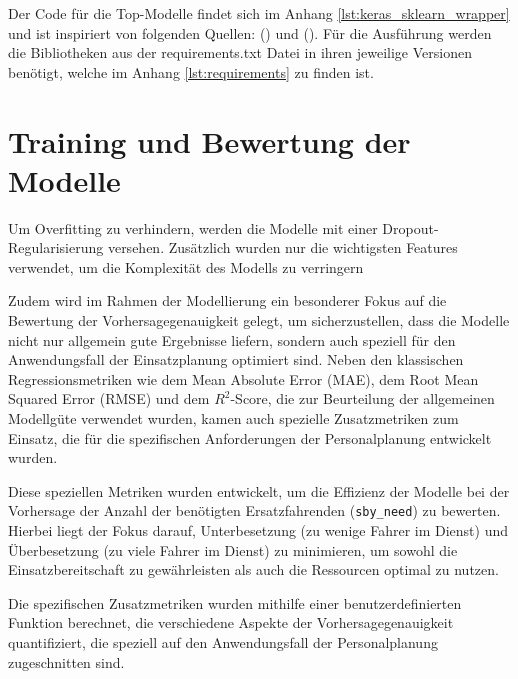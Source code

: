 \documentclass[%
pdftex,
oneside,			%
11pt,				%
parskip=half,		%
headheight = 12pt,	%
headsepline,		%
footsepline,		%
footheight = 16pt,	%
abstracton,		%
DIV=calc,		%
BCOR=8mm,		%
headinclude=false,	%
footinclude=false,	%
listof=totoc,		%
toc=bibliography,	%
]{scrreprt}	%
\begin{document}
        Der Code für die Top-Modelle findet sich im Anhang \ref{lst:keras_sklearn_wrapper} und ist inspiriert von folgenden Quellen: (\cite[][]{keras_cheat_sheet}) und (\cite[][]{tensorflow_keras}).
        Für die Ausführung werden die Bibliotheken aus der requirements.txt Datei in ihren jeweilige Versionen benötigt, welche im Anhang \ref{lst:requirements} zu finden ist.

    \section{Training und Bewertung der Modelle}

        Um Overfitting zu verhindern, werden die Modelle mit einer Dropout-Regularisierung versehen. 
        Zusätzlich wurden nur die wichtigsten Features verwendet, um die Komplexität des Modells zu verringern
                
        Zudem wird im Rahmen der Modellierung ein besonderer Fokus auf die Bewertung der Vorhersagegenauigkeit gelegt, um sicherzustellen, dass die Modelle nicht nur allgemein gute Ergebnisse liefern, sondern auch speziell für den Anwendungsfall der Einsatzplanung optimiert sind. 
        Neben den klassischen Regressionsmetriken wie dem Mean Absolute Error (MAE), dem Root Mean Squared Error (RMSE) und dem \(R^2\)-Score, die zur Beurteilung der allgemeinen Modellgüte verwendet wurden, kamen auch spezielle Zusatzmetriken zum Einsatz, die für die spezifischen Anforderungen der Personalplanung entwickelt wurden.

        Diese speziellen Metriken wurden entwickelt, um die Effizienz der Modelle bei der Vorhersage der Anzahl der benötigten Ersatzfahrenden (\texttt{sby\_need}) zu bewerten. 
        Hierbei liegt der Fokus darauf, Unterbesetzung (zu wenige Fahrer im Dienst) und Überbesetzung (zu viele Fahrer im Dienst) zu minimieren, um sowohl die Einsatzbereitschaft zu gewährleisten als auch die Ressourcen optimal zu nutzen.

        Die spezifischen Zusatzmetriken wurden mithilfe einer benutzerdefinierten Funktion berechnet, die verschiedene Aspekte der Vorhersagegenauigkeit quantifiziert, die speziell auf den Anwendungsfall der Personalplanung zugeschnitten sind.
\end{document}
